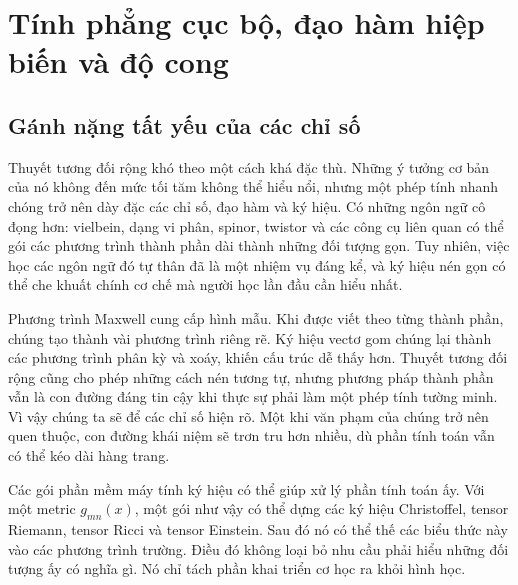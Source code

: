 \chapter{Tính phẳng cục bộ, đạo hàm hiệp biến và độ cong}


\section{Gánh nặng tất yếu của các chỉ số}

Thuyết tương đối rộng khó theo một cách khá đặc thù. Những ý tưởng cơ bản của nó không đến mức tối tăm không thể hiểu nổi, nhưng một phép tính nhanh chóng trở nên dày đặc các chỉ số, đạo hàm và ký hiệu. Có những ngôn ngữ cô đọng hơn: vielbein, dạng vi phân, spinor, twistor và các công cụ liên quan có thể gói các phương trình thành phần dài thành những đối tượng gọn. Tuy nhiên, việc học các ngôn ngữ đó tự thân đã là một nhiệm vụ đáng kể, và ký hiệu nén gọn có thể che khuất chính cơ chế mà người học lần đầu cần hiểu nhất.

Phương trình Maxwell cung cấp hình mẫu. Khi được viết theo từng thành phần, chúng tạo thành vài phương trình riêng rẽ. Ký hiệu vectơ gom chúng lại thành các phương trình phân kỳ và xoáy, khiến cấu trúc dễ thấy hơn. Thuyết tương đối rộng cũng cho phép những cách nén tương tự, nhưng phương pháp thành phần vẫn là con đường đáng tin cậy khi thực sự phải làm một phép tính tường minh. Vì vậy chúng ta sẽ để các chỉ số hiện rõ. Một khi văn phạm của chúng trở nên quen thuộc, con đường khái niệm sẽ trơn tru hơn nhiều, dù phần tính toán vẫn có thể kéo dài hàng trang.

Các gói phần mềm máy tính ký hiệu có thể giúp xử lý phần tính toán ấy. Với một metric \(g_{mn}(x)\), một gói như vậy có thể dựng các ký hiệu Christoffel, tensor Riemann, tensor Ricci và tensor Einstein. Sau đó nó có thể thế các biểu thức này vào các phương trình trường. Điều đó không loại bỏ nhu cầu phải hiểu những đối tượng ấy có nghĩa gì. Nó chỉ tách phần khai triển cơ học ra khỏi hình học.

